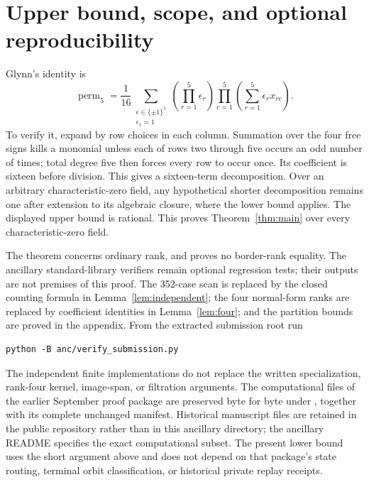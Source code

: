 \documentclass[11pt]{amsart}
\theoremstyle{definition}
\numberwithin{equation}{section}
\newcommand{\perm}{\operatorname{perm}}
\begin{document}
\section{Upper bound, scope, and optional reproducibility}
Glynn's identity \cite{Glynn2010} is
\[
 \perm_5=\frac1{16}
 \sum_{\substack{\epsilon\in\{\pm1\}^5\\\epsilon_1=1}}
 \left(\prod_{r=1}^5\epsilon_r\right)
 \prod_{c=1}^5\left(\sum_{r=1}^5\epsilon_rx_{rc}\right).
\]
To verify it, expand by row choices in each column. Summation over the four
free signs kills a monomial unless each of rows two through five occurs an
odd number of times; total degree five then forces every row to occur once.
Its coefficient is sixteen before division. This gives a sixteen-term
decomposition. Over an arbitrary characteristic-zero field, any hypothetical
shorter decomposition remains one after extension to its algebraic closure,
where the lower bound applies. The displayed upper bound is rational.
This proves Theorem~\ref{thm:main} over every characteristic-zero field.

The theorem concerns ordinary rank, and proves no border-rank equality.
The ancillary standard-library verifiers remain optional regression tests;
their outputs are not premises of this proof. The 352-case scan is replaced
by the closed counting formula in Lemma~\ref{lem:independent}; the four
normal-form ranks are replaced by coefficient identities in Lemma~\ref{lem:four};
and the partition bounds are proved in the appendix. From the extracted
submission root run
\begin{verbatim}
python -B anc/verify_submission.py
\end{verbatim}
The independent finite implementations do not replace the written
specialization, rank-four kernel, image-span, or filtration arguments.
The computational files of the earlier September proof package are
preserved byte for byte under , together with its complete
unchanged manifest. Historical manuscript files are retained in the public
repository rather than in this ancillary directory; the ancillary README
specifies the exact computational subset. The present lower bound uses the
short argument above and does not depend on that package's state routing,
terminal orbit classification, or historical private replay receipts.

\appendix
\end{document}
